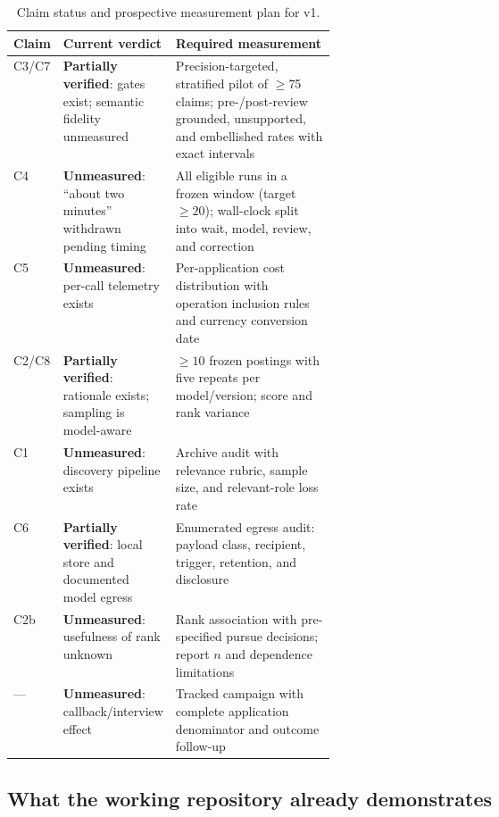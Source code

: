 \documentclass[11pt]{article}
\begin{document}
\begin{table}[H]
\centering
\footnotesize
\begin{tabularx}{\linewidth}{p{0.08\linewidth}p{0.34\linewidth}X}
\toprule
\textbf{Claim} & \textbf{Current verdict} & \textbf{Required measurement} \\
\midrule
C3/C7 & \textbf{Partially verified}: gates exist; semantic fidelity unmeasured & Precision-targeted, stratified pilot of $\geq$75 claims; pre-/post-review grounded, unsupported, and embellished rates with exact intervals \\
C4 & \textbf{Unmeasured}: ``about two minutes'' withdrawn pending timing & All eligible runs in a frozen window (target $\geq20$); wall-clock split into wait, model, review, and correction \\
C5 & \textbf{Unmeasured}: per-call telemetry exists & Per-application cost distribution with operation inclusion rules and currency conversion date \\
C2/C8 & \textbf{Partially verified}: rationale exists; sampling is model-aware & $\geq10$ frozen postings with five repeats per model/version; score and rank variance \\
C1 & \textbf{Unmeasured}: discovery pipeline exists & Archive audit with relevance rubric, sample size, and relevant-role loss rate \\
C6 & \textbf{Partially verified}: local store and documented model egress & Enumerated egress audit: payload class, recipient, trigger, retention, and disclosure \\
C2b & \textbf{Unmeasured}: usefulness of rank unknown & Rank association with pre-specified pursue decisions; report $n$ and dependence limitations \\
--- & \textbf{Unmeasured}: callback/interview effect & Tracked campaign with complete application denominator and outcome follow-up \\
\bottomrule
\end{tabularx}
\caption{Claim status and prospective measurement plan for v1.}
\label{tab:pending}
\end{table}

\subsection{What the working repository already demonstrates}
\end{document}
